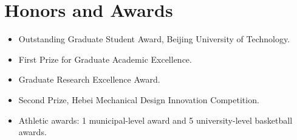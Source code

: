 \documentclass[11pt,a4paper]{article}
\begin{document}
\section*{Honors and Awards}
\begin{itemize}
	\item Outstanding Graduate Student Award, Beijing University of Technology.
	\item First Prize for Graduate Academic Excellence.
	\item Graduate Research Excellence Award.
	\item Second Prize, Hebei Mechanical Design Innovation Competition.
	\item Athletic awards: 1 municipal-level award and 5 university-level basketball awards.
\end{itemize}
\end{document}
